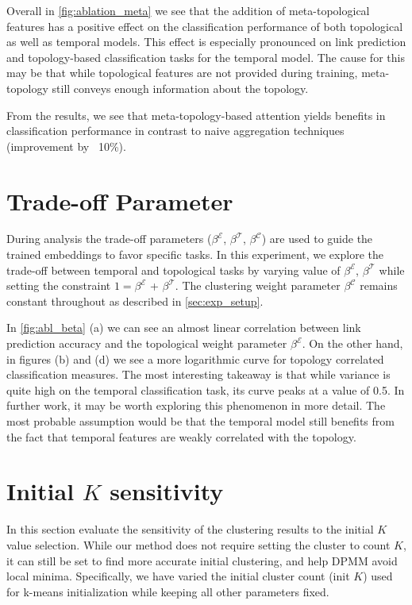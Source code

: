 

Overall in \cref{fig:ablation_meta} we see that the addition of meta-topological features has a positive effect on the classification performance of both topological as well as temporal models. 
This effect is especially pronounced on link prediction and topology-based classification tasks for the temporal model. 
The cause for this may be that while topological features are not provided during training, meta-topology still conveys enough information about the topology.

From the results, we see that meta-topology-based attention yields benefits in classification performance in contrast to naive aggregation techniques (improvement by ~10\%).

\section{Trade-off Parameter} \label{sec:abl:aux_emb}
During analysis the trade-off parameters ($\beta^{\mathcal{E}}$, $\beta^{\mathcal{T}}$, $\beta^{\mathcal{C}}$) are used to guide the trained embeddings to favor specific tasks.
In this experiment, we explore the trade-off between temporal and topological tasks by varying value of $\beta^{\mathcal{E}}$, $\beta^{\mathcal{T}}$ while setting the constraint $1 = \beta^{\mathcal{E}}$ + $\beta^{\mathcal{T}}$. 
The clustering weight parameter $\beta^{\mathcal{C}}$ remains constant throughout as described in \cref{sec:exp_setup}.

In \cref{fig:abl_beta} (a) we can see an almost linear correlation between link prediction accuracy and the topological weight parameter $\beta^{\mathcal{E}}$.
On the other hand, in figures (b) and (d) we see a more logarithmic curve for topology correlated classification measures.
The most interesting takeaway is that while variance is quite high on the temporal classification task, its curve peaks at a value of 0.5.
In further work, it may be worth exploring this phenomenon in more detail. 
The most probable assumption would be that the temporal model still benefits from the fact that temporal features are weakly correlated with the topology.



\section{Initial $K$ sensitivity}
In this section evaluate the sensitivity of the clustering results to the initial $K$ value selection.
While our method does not require setting the cluster to count $K$, it can still be set to find more accurate initial clustering, and help DPMM avoid local minima.
Specifically, we have varied the initial cluster count (init $K$) used for k-means initialization while keeping all other parameters fixed.

